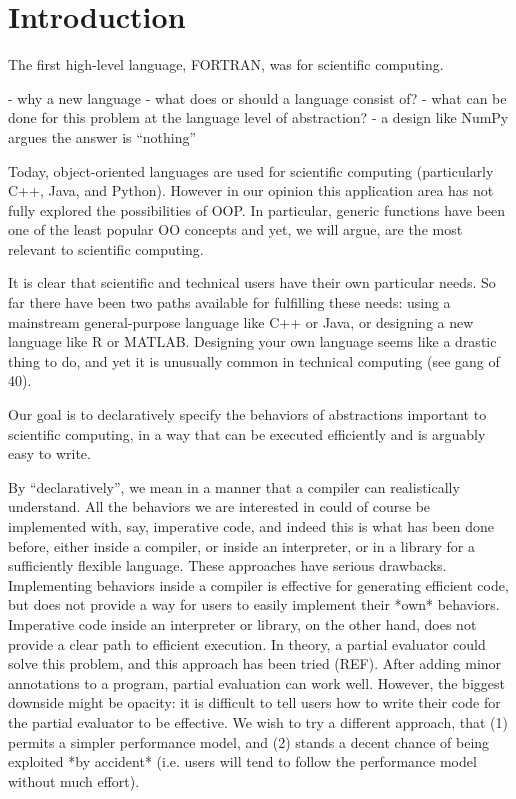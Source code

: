 \chapter{Introduction}

The first high-level language, FORTRAN, was for scientific computing.

- why a new language
- what does or should a language consist of?
- what can be done for this problem at the language level of abstraction?
  - a design like NumPy argues the answer is ``nothing''

Today, object-oriented languages are used for scientific computing
(particularly C++, Java, and Python). However in our opinion this
application area has not fully explored the possibilities of OOP. In
particular, generic functions have been one of the least popular
OO concepts and yet, we will argue, are the most relevant to scientific
computing.

It is clear that scientific and technical users have their own particular
needs. So far there have been two paths available for fulfilling these
needs: using a mainstream general-purpose language like C++ or Java, or
designing a new language like R or MATLAB. Designing your own language
seems like a drastic thing to do, and yet it is unusually common in
technical computing (see gang of 40).


Our goal is to declaratively specify the behaviors of abstractions
important to scientific computing, in a way that can be executed
efficiently and is arguably easy to write.

By ``declaratively'', we mean in a manner that a compiler can
realistically understand. All the behaviors we are interested in
could of course be implemented with, say, imperative code, and indeed
this is what has been done before, either inside a compiler, or inside
an interpreter, or in a library for a sufficiently flexible language.
These approaches have serious drawbacks. Implementing behaviors
inside a compiler is effective for generating efficient code, but
does not provide a way for users to easily implement their *own*
behaviors. Imperative code inside an interpreter or library, on the other hand,
does not provide a clear path to efficient execution. In theory, a
partial evaluator could solve this problem, and this approach has been
tried (REF). After adding minor annotations to a program, partial evaluation
can work well. However, the biggest downside might be opacity: it is
difficult to tell users how to write their code for the partial
evaluator to be effective. We wish to try a different approach, that
(1) permits a simpler performance model, and (2) stands a decent chance
of being exploited *by accident* (i.e. users will tend to follow the performance
model without much effort).


